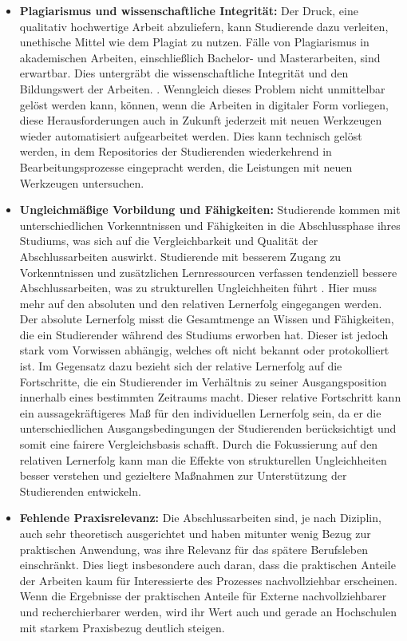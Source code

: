 \documentclass[conference]{IEEEtran}
\begin{document}
\begin{itemize}[leftmargin=*]
    \item \textbf{Plagiarismus und wissenschaftliche Integrität:}
    \newline Der Druck, eine qualitativ hochwertige Arbeit abzuliefern, kann Studierende dazu verleiten, unethische Mittel wie dem Plagiat zu nutzen. Fälle von Plagiarismus in akademischen Arbeiten, einschließlich Bachelor- und Masterarbeiten, sind erwartbar. Dies untergräbt die wissenschaftliche Integrität und den Bildungswert der Arbeiten. \cite{Larsson2013}. Wenngleich dieses Problem nicht unmittelbar gelöst werden kann, können, wenn die Arbeiten in digitaler Form vorliegen, diese Herausforderungen auch in Zukunft jederzeit mit neuen Werkzeugen wieder automatisiert aufgearbeitet werden. Dies kann technisch gelöst werden, in dem Repositories der Studierenden wiederkehrend in Bearbeitungsprozesse eingepracht werden, die Leistungen mit neuen Werkzeugen untersuchen.

    \item \textbf{Ungleichmäßige Vorbildung und Fähigkeiten:}
    \newline Studierende kommen mit unterschiedlichen Vorkenntnissen und Fähigkeiten in die Abschlussphase ihres Studiums, was sich auf die Vergleichbarkeit und Qualität der Abschlussarbeiten auswirkt.
    Studierende mit besserem Zugang zu Vorkenntnissen und zusätzlichen Lernressourcen verfassen tendenziell bessere Abschlussarbeiten, was zu strukturellen Ungleichheiten führt \cite{Evaluating2022}. Hier muss mehr auf den absoluten und den relativen Lernerfolg eingegangen werden. 
    Der absolute Lernerfolg misst die Gesamtmenge an Wissen und Fähigkeiten, die ein Studierender während des Studiums erworben hat. Dieser ist jedoch stark vom Vorwissen abhängig, welches oft nicht bekannt oder protokolliert ist. Im Gegensatz dazu bezieht sich der relative Lernerfolg auf die Fortschritte, die ein Studierender im Verhältnis zu seiner Ausgangsposition innerhalb eines bestimmten Zeitraums macht. Dieser relative Fortschritt kann ein aussagekräftigeres Maß für den individuellen Lernerfolg sein, da er die unterschiedlichen Ausgangsbedingungen der Studierenden berücksichtigt und somit eine fairere Vergleichsbasis schafft. Durch die Fokussierung auf den relativen Lernerfolg kann man die Effekte von strukturellen Ungleichheiten besser verstehen und gezieltere Maßnahmen zur Unterstützung der Studierenden entwickeln.


    \item \textbf{Fehlende Praxisrelevanz:}
    \newline Die Abschlussarbeiten sind, je nach Diziplin, auch sehr theoretisch ausgerichtet und haben mitunter wenig Bezug zur praktischen Anwendung, was ihre Relevanz für das spätere Berufsleben einschränkt. Dies liegt insbesondere auch daran, dass die praktischen Anteile der Arbeiten kaum für Interessierte des Prozesses nachvollziehbar erscheinen. Wenn die Ergebnisse der praktischen Anteile für Externe nachvollziehbarer und recherchierbarer werden, wird ihr Wert auch und gerade an Hochschulen mit starkem Praxisbezug deutlich steigen.


\end{itemize}
\end{document}
